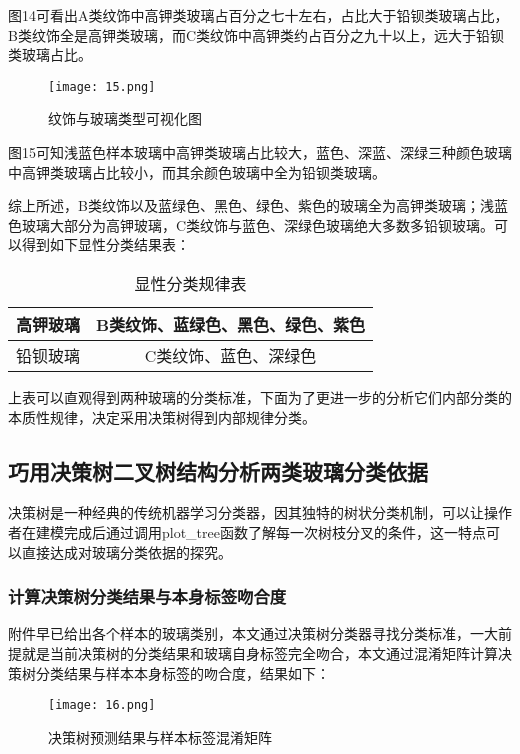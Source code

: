 图14可看出A类纹饰中高钾类玻璃占百分之七十左右，占比大于铅钡类玻璃占比，B类纹饰全是高钾类玻璃，而C类纹饰中高钾类约占百分之九十以上，远大于铅钡类玻璃占比。

\begin{figure}[H] 
	\centering %
	\texttt{[image: 15.png]} %
	\caption{纹饰与玻璃类型可视化图} %
	\label{Fig.main16} %
\end{figure}

图15可知浅蓝色样本玻璃中高钾类玻璃占比较大，蓝色、深蓝、深绿三种颜色玻璃中高钾类玻璃占比较小，而其余颜色玻璃中全为铅钡类玻璃。

综上所述，B类纹饰以及蓝绿色、黑色、绿色、紫色的玻璃全为高钾类玻璃；浅蓝色玻璃大部分为高钾玻璃，C类纹饰与蓝色、深绿色玻璃绝大多数多铅钡玻璃。可以得到如下显性分类结果表：

\begin{table}[H]
	\centering
	\begin{tabular}{c c} 
		\toprule[1.5pt]
		高钾玻璃 & B类纹饰、蓝绿色、黑色、绿色、紫色 \\
		\midrule[1pt]
		铅钡玻璃 & C类纹饰、蓝色、深绿色 \\
		\toprule[1.5pt]
	\end{tabular}
\caption{显性分类规律表}
\end{table}

上表可以直观得到两种玻璃的分类标准，下面为了更进一步的分析它们内部分类的本质性规律，决定采用决策树得到内部规律分类。

\subsection{巧用决策树二叉树结构分析两类玻璃分类依据}

决策树是一种经典的传统机器学习分类器，因其独特的树状分类机制，可以让操作者在建模完成后通过调用plot\_tree函数了解每一次树枝分叉的条件，这一特点可以直接达成对玻璃分类依据的探究。

\subsubsection{计算决策树分类结果与本身标签吻合度}

附件早已给出各个样本的玻璃类别，本文通过决策树分类器寻找分类标准，一大前提就是当前决策树的分类结果和玻璃自身标签完全吻合，本文通过混淆矩阵计算决策树分类结果与样本本身标签的吻合度，结果如下：

\begin{figure}[H] 
	\centering %
	\texttt{[image: 16.png]} %
	\caption{决策树预测结果与样本标签混淆矩阵} %
	\label{Fig.main17} %
\end{figure}


